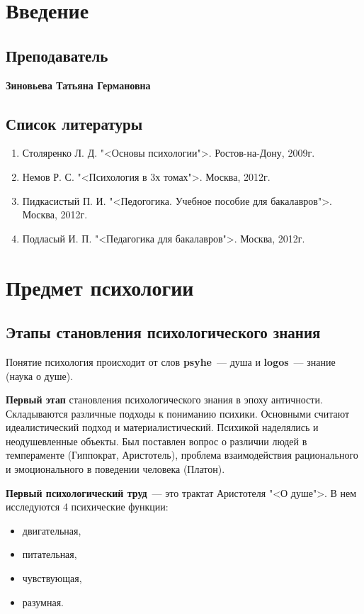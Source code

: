 \section{Введение}
\subsection{Преподаватель}
\textbf{Зиновьева Татьяна Германовна}

\subsection{Список литературы}
\begin{enumerate}
	\item Столяренко Л. Д. "<Основы психологии">. Ростов-на-Дону, 2009г.
	\item Немов Р. С. "<Психология в 3х томах">. Москва, 2012г.
	\item Пидкасистый П. И. "<Педогогика. Учебное пособие для бакалавров">. Москва, 2012г.
	\item Подласый И. П. "<Педагогика для бакалавров">. Москва, 2012г.
\end{enumerate}

\section{Предмет психологии}
\subsection{Этапы становления психологического знания}
Понятие психология происходит от слов \textbf{psyhe}~--- душа и \textbf{logos}~--- знание (наука о душе).

\textbf{Первый этап} становления психологического знания в эпоху античности. Складываются различные подходы к пониманию психики. Основными считают идеалистический подход и материалистический. Психикой наделялись и неодушевленные объекты. Был поставлен вопрос о различии людей в темпераменте (Гиппократ, Аристотель), проблема взаимодействия рационального и эмоционального в поведении человека (Платон).

\textbf{Первый психологический труд}~--- это трактат Аристотеля "<О душе">. В нем исследуются 4 психические функции:
\begin{itemize}
	\item двигательная,
	\item питательная,
	\item чувствующая,
	\item разумная.
\end{itemize}

